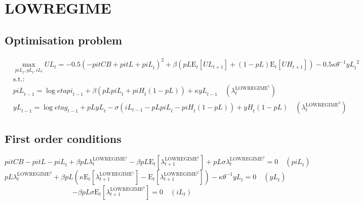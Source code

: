 \section{LOWREGIME}

\subsection{Optimisation problem}

\begin{align}
&\max_{{p\!i\!L}_{t}, {y\!L}_{t}, {i\!L}_{t}
} {U\!L}_{t} = -0.5\left(-{p\!i\!t\!C\!B} + {p\!i\!t\!L} + {p\!i\!L}_{t}\right)^{2} + {\beta} \left({{p\!L}} {\mathrm{E}_{t}\left[{U\!L}_{t+1}\right]} + \left(1 - {p\!L}\right) {\mathrm{E}_{t}\left[{U\!H}_{t+1}\right]}\right) - 0.5{\kappa} {\theta}^{-1} {{y\!L}_{t}}^{2}\\
&\mathrm{s.t.:}\nonumber\\
& {p\!i\!L}_{t-1} = \log{{e\!t\!a\!p\!i}_{t-1}} + {\beta} \left({{p\!L}} {{p\!i\!L}_{t}} + {{p\!i\!H}_{t}} \left(1 - {p\!L}\right)\right) + {\kappa} {{y\!L}_{t-1}} \quad \left(\lambda^{\mathrm{LOWREGIME}^{\mathrm{1}}}_{t}\right)\\
& {y\!L}_{t-1} = \log{{e\!t\!a\!g}_{t-1}} + {{p\!L}} {{y\!L}_{t}} - {\sigma} \left({i\!L}_{t-1} - {{p\!L}} {{p\!i\!L}_{t}} - {{p\!i\!H}_{t}} \left(1 - {p\!L}\right)\right) + {{y\!H}_{t}} \left(1 - {p\!L}\right) \quad \left(\lambda^{\mathrm{LOWREGIME}^{\mathrm{2}}}_{t}\right)
\end{align}


\subsection{First order conditions}

\begin{equation}
{p\!i\!t\!C\!B} - {p\!i\!t\!L} - {p\!i\!L}_{t} + {\beta} {{p\!L}} {\lambda^{\mathrm{LOWREGIME}^{\mathrm{1}}}_{t}} - {\beta} {{p\!L}} {\mathrm{E}_{t}\left[\lambda^{\mathrm{LOWREGIME}^{\mathrm{1}}}_{t+1}\right]} + {{p\!L}} {\sigma} {\lambda^{\mathrm{LOWREGIME}^{\mathrm{2}}}_{t}} = 0
 \quad \left({p\!i\!L}_{t}\right)
\end{equation}
\begin{equation}
{{p\!L}} {\lambda^{\mathrm{LOWREGIME}^{\mathrm{2}}}_{t}} + {\beta} {{p\!L}} \left({\kappa} {\mathrm{E}_{t}\left[\lambda^{\mathrm{LOWREGIME}^{\mathrm{1}}}_{t+1}\right]} - \mathrm{E}_{t}\left[\lambda^{\mathrm{LOWREGIME}^{\mathrm{2}}}_{t+1}\right]\right) - {\kappa} {\theta}^{-1} {{y\!L}_{t}} = 0
 \quad \left({y\!L}_{t}\right)
\end{equation}
\begin{equation}
-{\beta} {{p\!L}} {\sigma} {\mathrm{E}_{t}\left[\lambda^{\mathrm{LOWREGIME}^{\mathrm{2}}}_{t+1}\right]} = 0
 \quad \left({i\!L}_{t}\right)
\end{equation}





